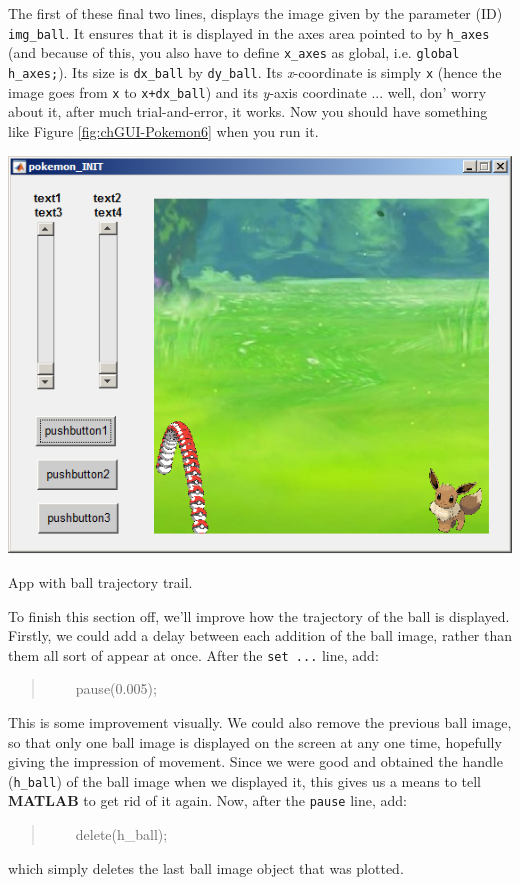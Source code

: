 \documentclass{tufte-book} %
\newenvironment{docspec}{\begin{quotation}\ttfamily\parskip0pt\parindent0pt\ignorespaces}{\end{quotation}}
\begin{document}
The first of these final two lines, displays the image given by the parameter (ID) \texttt{img\_ball}. It ensures that it is displayed in the axes area pointed to by \texttt{h\_axes} (and because of this, you also have to define \texttt{x\_axes} as global, i.e. \texttt{global h\_axes;}). Its size is \texttt{dx\_ball} by \texttt{dy\_ball}. Its \textit{x}-coordinate is simply \texttt{x} (hence the image goes from \texttt{x} to \texttt{x+dx\_ball}) and its \textit{y}-axis coordinate ... well, don' worry about it, after much trial-and-error, it works.
Now you should have something like Figure \ref{fig:chGUI-Pokemon6} when you run it.

\begin{marginfigure}[0.0in]
\includegraphics[width=\linewidth]{chGUI-Pokemon6.png}
\caption{App with ball trajectory trail.}
\label{fig:chGUI-Pokemon6}
\end{marginfigure}

To finish this section off, we'll improve how the trajectory of the ball is displayed. Firstly, we could add a delay between each addition of the ball image, rather than them all sort of appear at once. After the \texttt{set ...} line, add:
\begin{docspec}
\ \ \ \ pause(0.005);
\end{docspec}
This is some improvement visually. We could also remove the previous ball image, so that only one ball image is displayed on the screen at any one time, hopefully giving the impression of movement. Since we were good and obtained the handle (\texttt{h\_ball}) of the ball image when we displayed it, this gives us a means to tell \textbf{MATLAB} to get rid of it again. Now, after the \texttt{pause} line, add:
\begin{docspec}
\ \ \ \    delete(h\_ball);
\end{docspec}
which simply deletes the last ball image object that was plotted.
\end{document}
